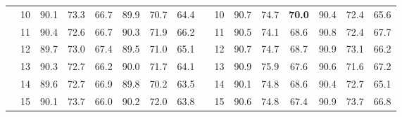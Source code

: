 \begin{table}[p]
{\begin{tabular}{c c | c c c | c c c || c c | c c c | c c c}
             & 10 & 90.1 & 73.3 & 66.7 & 89.9 & 70.7 & 64.4 &  & 10 & 90.7 & 74.7 & \textbf{70.0} & 90.4 & 72.4 & 65.6 \\
             & 11 & 90.4 & 72.6 & 66.7 & 90.3 & 71.9 & 66.2 &  & 11 & 90.5 & 74.1 & 68.6 & 90.8 & 72.4 & 67.7 \\
             & 12 & 89.7 & 73.0 & 67.4 & 89.5 & 71.0 & 65.1 &  & 12 & 90.7 & 74.7 & 68.7 & 90.9 & 73.1 & 66.2 \\
             & 13 & 90.3 & 72.7 & 66.2 & 90.0 & 71.7 & 64.1 &  & 13 & 90.9 & 75.9 & 67.6 & 90.6 & 71.6 & 67.2 \\
             & 14 & 89.6 & 72.7 & 66.9 & 89.8 & 70.2 & 63.5 &  & 14 & 90.1 & 74.8 & 68.6 & 90.4 & 72.7 & 65.1 \\
             & 15 & 90.1 & 73.7 & 66.0 & 90.2 & 72.0 & 63.8 &  & 15 & 90.6 & 74.8 & 67.4 & 90.9 & 73.7 & 66.8 \\
    \bottomrule
\end{tabular}%
}
\label{tab:duration_distal_intermediate_plain}
\end{table}

